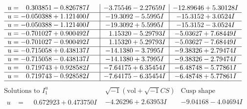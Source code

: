 \documentclass[1p]{elsarticle_modified}
\theoremstyle{definition}
\newcommand{\I}{\sqrt{-1}}
\begin{document}
$$\begin{array}{c|c|c}
\begin{aligned}
u &= \phantom{-}0.303851 - 0.826787 I\end{aligned}
 & -3.75546 - 2.27659 I & -12.89646 + 5.30128 I \\ \hline\begin{aligned}
u &= -0.050388 + 1.121400 I\end{aligned}
 & -19.3092 - 5.5995 I & -15.3152 + 3.0524 I \\ \hline\begin{aligned}
u &= -0.050388 - 1.121400 I\end{aligned}
 & -19.3092 + 5.5995 I & -15.3152 - 3.0524 I \\ \hline\begin{aligned}
u &= -0.701027 + 0.900492 I\end{aligned}
 & \phantom{-}1.15320 - 5.29793 I & -5.03627 + 7.68449 I \\ \hline\begin{aligned}
u &= -0.701027 - 0.900492 I\end{aligned}
 & \phantom{-}1.15320 + 5.29793 I & -5.03627 - 7.68449 I \\ \hline\begin{aligned}
u &= -0.715058 + 0.438137 I\end{aligned}
 & -14.1380 - 3.7995 I & -9.38326 + 2.79474 I \\ \hline\begin{aligned}
u &= -0.715058 - 0.438137 I\end{aligned}
 & -14.1380 + 3.7995 I & -9.38326 - 2.79474 I \\ \hline\begin{aligned}
u &= \phantom{-}0.719743 + 0.928582 I\end{aligned}
 & -7.64175 + 6.35454 I & -6.48748 - 5.77861 I \\ \hline\begin{aligned}
u &= \phantom{-}0.719743 - 0.928582 I\end{aligned}
 & -7.64175 - 6.35454 I & -6.48748 + 5.77861 I\\
 \hline 
 \end{array}$$\newpage$$\begin{array}{c|c|c}  
\text{Solutions to }I^u_{1}& \I (\text{vol} + \sqrt{-1}CS) & \text{Cusp shape}\\
 \hline 
\begin{aligned}
u &= \phantom{-}0.672923 + 0.473750 I\end{aligned}
 & -4.26296 + 2.63953 I & -9.04168 - 4.04694 I \\ \hline\begin{aligned}

\end{aligned}
\end{array}$$
\end{document}
